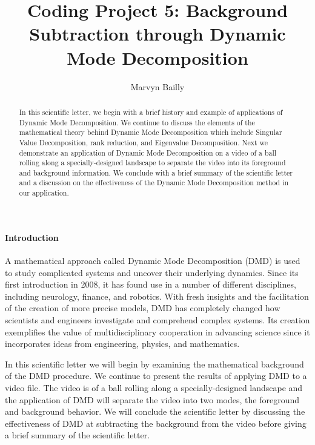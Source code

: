 \documentclass[12pt]{article}%
\begin{document}
\title{Coding Project 5:  Background Subtraction through Dynamic Mode Decomposition}

\author{Marvyn Bailly}
\date{}

\maketitle


\begin{abstract}
    In this scientific letter, we begin with a brief history and example of applications of Dynamic Mode Decomposition. We continue to discuss the elements of the mathematical theory behind Dynamic Mode Decomposition which include Singular Value Decomposition, rank reduction, and Eigenvalue Decomposition. Next we demonstrate an application of Dynamic Mode Decomposition on a video of a ball rolling along a specially-designed landscape to separate the video into its foreground and background information. We conclude with a brief summary of the scientific letter and a discussion on the effectiveness of the Dynamic Mode Decomposition method in our application.  
\end{abstract}


\paragraph{Introduction}
\label{Sec: Intro}

A mathematical approach called Dynamic Mode Decomposition (DMD) is used to study complicated systems and uncover their underlying dynamics. Since its first introduction in 2008, it has found use in a number of different disciplines, including neurology, finance, and robotics. With fresh insights and the facilitation of the creation of more precise models, DMD has completely changed how scientists and engineers investigate and comprehend complex systems. Its creation exemplifies the value of multidisciplinary cooperation in advancing science since it incorporates ideas from engineering, physics, and mathematics.

In this scientific letter we will begin by examining the mathematical background of the DMD procedure. We continue to present the results of applying DMD to a video file. The video is of a ball rolling along a specially-designed landscape and the application of DMD will separate the video into two modes, the foreground and background behavior. We will conclude the scientific letter by discussing the effectiveness of DMD at subtracting the background from the video before giving a brief summary of the scientific letter.  
\end{document}
